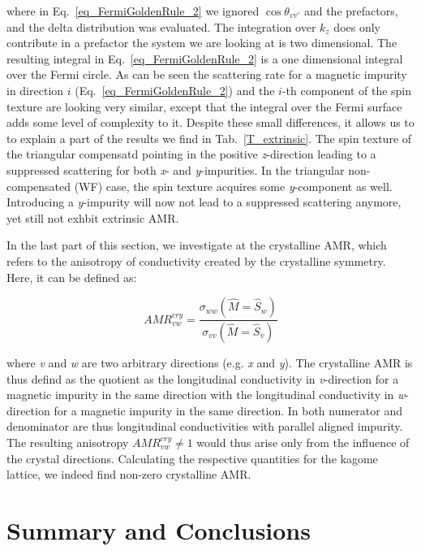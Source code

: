 \documentclass[prb,showpacs,amsmath,amssymb,superscriptaddress,twocolumn,floatfix]{revtex4-1}
\begin{document}
where in Eq.~\ref{eq_FermiGoldenRule_2} we ignored $\cos \theta_{vv'}$ and the prefactors, and the delta distribution was evaluated. The integration over $k_z$ does only contribute in a prefactor the system we are looking at is two dimensional. The resulting integral in Eq.~\ref{eq_FermiGoldenRule_2} is a one dimensional integral over the Fermi circle. As can be seen the scattering rate for a magnetic impurity in direction $i$ (Eq.~\ref{eq_FermiGoldenRule_2}) and the $i$-th component of the spin texture are looking very similar, except that the integral over the Fermi surface adds some level of complexity to it. Despite these small differences, it allows us to to explain a part of the results we find in Tab.~\ref{T_extrinsic}. The spin texture of the triangular compensatd pointing in the positive \textit{z}-direction leading to a suppressed scattering for both \textit{x}- and \textit{y}-impurities. In the triangular non-compensated (WF) case, the spin texture acquires some \textit{y}-component as well. Introducing a \textit{y}-impurity will now not lead to a suppressed scattering anymore, yet still not exhbit extrinsic AMR.

In the last part of this section, we investigate at the crystalline AMR, which refers to the anisotropy of conductivity created by the crystalline symmetry. Here, it can be defined as:

\begin{equation}
	AMR^{cry}_{vw} = \frac{\sigma_{ww} (\hat{M} = \hat{S}_w)}{\sigma_{vv} (\hat{M} = \hat{S}_v)}
\end{equation}

where \textit{v} and \textit{w} are two arbitrary directions (e.g. \textit{x} and \textit{y}). The crystalline AMR is thus defind as the quotient as the longitudinal conductivity in \textit{v}-direction for a magnetic impurity in the same direction with the longitudinal conductivity in \textit{w}-direction for a magnetic impurity in the same direction. In both numerator and denominator are thus longitudinal conductivities with parallel aligned impurity. The resulting anisotropy $AMR^{cry}_{vw} \neq 1$ would thus arise only from the influence of the crystal directions. Calculating the respective quantities for the kagome lattice, we indeed find non-zero crystalline AMR.


\section{Summary and Conclusions}
\label{sec_Sum}
\end{document}
